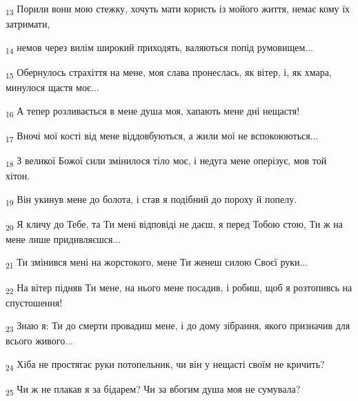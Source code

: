 \begin{tcolorbox}
\textsubscript{13} Порили вони мою стежку, хочуть мати користь із мойого життя, немає кому їх затримати,
\end{tcolorbox}
\begin{tcolorbox}
\textsubscript{14} немов через вилім широкий приходять, валяються попід румовищем...
\end{tcolorbox}
\begin{tcolorbox}
\textsubscript{15} Обернулось страхіття на мене, моя слава пронеслась, як вітер, і, як хмара, минулося щастя моє...
\end{tcolorbox}
\begin{tcolorbox}
\textsubscript{16} А тепер розливається в мене душа моя, хапають мене дні нещастя!
\end{tcolorbox}
\begin{tcolorbox}
\textsubscript{17} Вночі мої кості від мене віддовбуються, а жили мої не вспокоюються...
\end{tcolorbox}
\begin{tcolorbox}
\textsubscript{18} З великої Божої сили змінилося тіло моє, і недуга мене оперізує, мов той хітон.
\end{tcolorbox}
\begin{tcolorbox}
\textsubscript{19} Він укинув мене до болота, і став я подібний до пороху й попелу.
\end{tcolorbox}
\begin{tcolorbox}
\textsubscript{20} Я кличу до Тебе, та Ти мені відповіді не даєш, я перед Тобою стою, Ти ж на мене лише придивляєшся...
\end{tcolorbox}
\begin{tcolorbox}
\textsubscript{21} Ти змінився мені на жорстокого, мене Ти женеш силою Своєї руки...
\end{tcolorbox}
\begin{tcolorbox}
\textsubscript{22} На вітер підняв Ти мене, на нього мене посадив, і робиш, щоб я розтопивсь на спустошення!
\end{tcolorbox}
\begin{tcolorbox}
\textsubscript{23} Знаю я: Ти до смерти провадиш мене, і до дому зібрання, якого призначив для всього живого...
\end{tcolorbox}
\begin{tcolorbox}
\textsubscript{24} Хіба не простягає руки потопельник, чи він у нещасті своїм не кричить?
\end{tcolorbox}
\begin{tcolorbox}
\textsubscript{25} Чи ж не плакав я за бідарем? Чи за вбогим душа моя не сумувала?
\end{tcolorbox}
